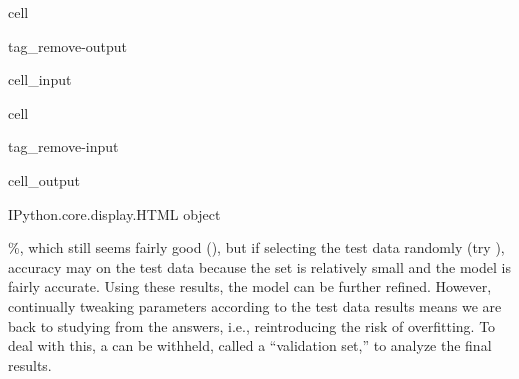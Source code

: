 \documentclass[letterpaper,10pt,english]{jupyterBook}
\begin{document}
\begin{sphinxuseclass}{cell}
\begin{sphinxuseclass}{tag_remove-output}\begin{sphinxVerbatimInput}

\begin{sphinxuseclass}{cell_input}
\begin{sphinxVerbatim}[commandchars=\\\{\}]
   

  

\end{sphinxVerbatim}

\end{sphinxuseclass}\end{sphinxVerbatimInput}

\end{sphinxuseclass}
\end{sphinxuseclass}
\begin{sphinxuseclass}{cell}
\begin{sphinxuseclass}{tag_remove-input}\begin{sphinxVerbatimOutput}

\begin{sphinxuseclass}{cell_output}
\begin{sphinxVerbatim}[commandchars=\\\{\}]
\PYGZlt{}IPython.core.display.HTML object\PYGZgt{}
\end{sphinxVerbatim}

\end{sphinxuseclass}\end{sphinxVerbatimOutput}

\end{sphinxuseclass}
\end{sphinxuseclass}
\%, which still seems fairly good ({\hyperref[\detokenize{task2_c/task2_part_c:task2-part-c-application-performance}]{}}), but if selecting the test data randomly (try ), accuracy may  on the test data because the set is relatively small and the model is fairly accurate. Using these results, the model can be further refined. However, continually tweaking parameters according to the test data results means we are back to studying from the answers, i.e., reintroducing the risk of overfitting. To deal with this, a  can be withheld, called a “validation set,” to analyze the final results.
\end{document}
